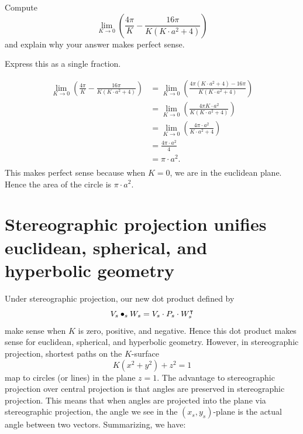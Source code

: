 \documentclass{ximera}
\begin{document}
\begin{problem}
  Compute
  \[
  \lim_{K\to 0} \left(\frac{4\pi}{K}-\frac{16\pi}{K\left(K\cdot a^2+4\right)}\right)
  \]
  and explain why your answer makes perfect sense.
  \begin{hint}
    Express this as a single fraction.
  \end{hint}
  \begin{freeResponse}
    \begin{align*}
    \lim_{K\to 0} \left(\frac{4\pi}{K}-\frac{16\pi}{K\left(K\cdot a^2+4\right)}\right)
    &= \lim_{K\to 0} \left(\frac{4\pi\left(K\cdot a^2+4\right) - 16\pi}{K\left(K\cdot a^2+4\right)}\right)\\
    &= \lim_{K\to 0} \left(\frac{4\pi K\cdot a^2}{K\left(K\cdot a^2+4\right)}\right)\\
    &= \lim_{K\to 0} \left(\frac{4\pi\cdot a^2}{K\cdot a^2+4}\right)\\
    &= \frac{4\pi\cdot a^2}{4}\\
    &= \pi\cdot a^2.\\
    \end{align*}
    This makes perfect sense because when $K=0$, we are in the
    euclidean plane. Hence the area of the circle is $\pi\cdot a^2$.
  \end{freeResponse}
\end{problem}




\section{Stereographic projection unifies euclidean, spherical, and hyperbolic geometry}


Under stereographic projection, our new dot product defined by
\[
V_s\bullet_s W_s = V_s\cdot P_s\cdot W_s^\intercal
\]
make sense when $K$ is zero, positive, and negative. Hence this dot
product makes sense for euclidean, spherical, and hyperbolic
geometry. However, in stereographic projection, shortest paths on the
$K$-surface
\[
K\left(x^2 + y^2\right) + z^2 = 1
\]
map to circles (or lines) in the plane $z=1$. The advantage to
stereographic projection over central projection is that angles are
preserved in stereographic projection. This means that when angles are
projected into the plane via stereographic projection, the angle we
see in the $(x_s,y_s)$-plane is the actual angle between two
vectors. Summarizing, we have:
\end{document}
